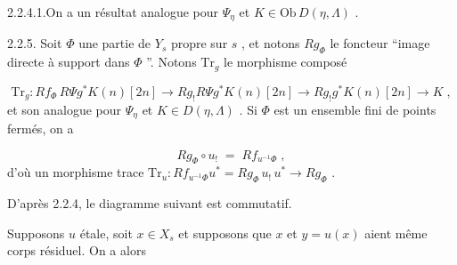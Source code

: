2.2.4.1.On a un résultat analogue pour $\Psi_\eta$ et $K \in \mathrm{Ob}\, D(\eta,\Lambda)$ .

2.2.5. Soit $\Phi$ une partie de $Y_s$ propre sur $s$ , et notons $Rg_\Phi$ le foncteur ``image directe à support dans $\Phi$ ''. Notons $\mathrm{Tr}_g$ le morphisme composé

\begin{equation}\tag{2.2.5.1}
\mathrm{Tr}_g : Rf_\Phi \, R\Psi g^* K(n)[2n] \to Rg_! R\Psi g^* K(n)[2n] \to Rg_! g^* K(n)[2n] \to K \; ,
\end{equation}
et son analogue pour $\Psi_\eta$ et $K \in D(\eta, \Lambda)$ . Si $\Phi$ est un ensemble fini de points fermés, on a

\begin{equation*}
Rg_\Phi \circ u_! \; = \; Rf_{u^{-1}\Phi} \; ,
\end{equation*}
d'où un morphisme trace $\mathrm{Tr}_u : Rf_{u^{-1}\Phi} u^* = Rg_\Phi \, u_! \, u^* \to Rg_\Phi$ .

D'après 2.2.4, le diagramme suivant est commutatif.

\begin{center}
\end{center}
Supposons $u$ étale, soit $x \in X_s$ et supposons que $x$ et $y = u(x)$ aient même corps résiduel. On a alors

